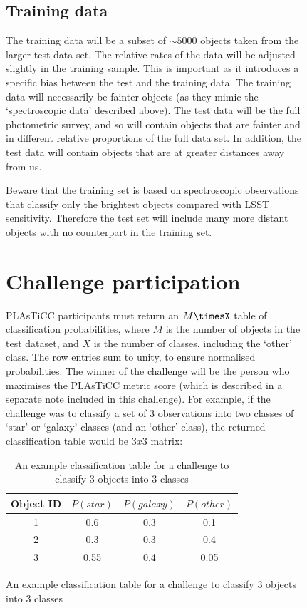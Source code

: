 \documentclass[\docopts]{\docclass}
\begin{document}
\begin{figure}[htbp!]
\subsection{Training data}
The training data will be a subset of $\sim 5000$ objects taken from the larger test data set. The relative rates of the data will be adjusted slightly in the training sample. This is important as it introduces a specific bias between the test and the training data. The training data will necessarily be fainter objects (as they mimic the `spectroscopic data' described above). The test data will be the full photometric survey, and so will contain objects that are fainter and in different relative proportions of the full data set. In addition, the test data will contain objects that are at greater distances away from us.

Beware that the training set is based on spectroscopic observations that classify only the brightest objects compared with LSST sensitivity. Therefore the test set will include many more distant objects with no counterpart in the training set.




\section{Challenge participation}
\label{sec:conclusion}
PLAsTiCC participants must return an $M\timesX$ table of classification probabilities, where $M$ is the number of objects in the test dataset, and $X$ is the number of classes, including the `other' class. The row entries sum to unity, to ensure normalised probabilities. The winner of the challenge will be the person who maximises the PLAsTiCC metric score (which is described in a separate note included in this challenge). 
For example, if the challenge was to classify a set of 3 observations into two classes of `star' or `galaxy' classes (and an `other' class), the returned classification table would be $3x3$ matrix:

\begin{table}[htbp!]
\begin{center}
\begin{tabular}{|c|c|c|c|}
Object ID & $P(star)$ & $P(galaxy)$ & $P(other)$ \\
\hline
1 & 0.6 & 0.3 & 0.1\\
2 & 0.3 & 0.3 & 0.4\\
3 & 0.55 & 0.4 & 0.05\\
\end{tabular}
\caption{An example classification table for a challenge to classify 3 objects into 3 classes}
\end{center}
\end{table}


\end{figure}
\end{document}

